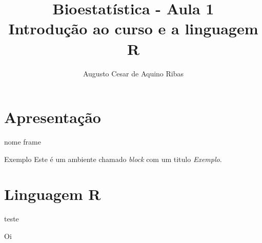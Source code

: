 \documentclass[11pt]{beamer}
\author{Augusto Cesar de Aquino Ribas}
\title[Bioestatística]{Bioestatística - Aula 1 \\
Introdução ao curso e a linguagem R}
\institute{Teste}
\date{}
\begin{document}
\begin{frame}[plain]
\titlepage
\end{frame}

\begin{frame}
\tableofcontents
\end{frame}

\section{Apresentação}

\begin{frame}{nome frame}

\begin{block}{Exemplo}
Este é um ambiente chamado \emph{block} com um titulo \emph{Exemplo}.
\end{block}

\end{frame}

\section{Linguagem R}
\begin{frame}

teste

\end{frame}


\begin{frame}{Oi}

\end{frame}
\end{document}
